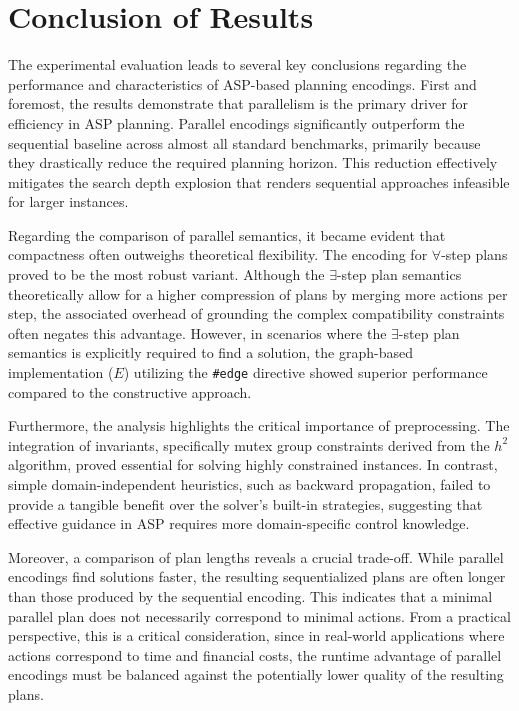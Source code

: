 \documentclass[
     11pt,                    %
     a4paper,             %
     BCOR=10mm,     %
     DIV=14,                 %
     listof=totoc,                    %
     bibliography=totoc,       %
     index=totoc,              %
     parskip            %
     twoside,
     headsepline
     ]{scrreprt}
\theoremstyle{definition}
\theoremstyle{definition}
\theoremstyle{remark}
\theoremstyle{bfnote}
\begin{document}
\section{Conclusion of Results}
The experimental evaluation leads to several key conclusions regarding the performance and characteristics of ASP-based planning encodings.
First and foremost, the results demonstrate that parallelism is the primary driver for efficiency in ASP planning. Parallel encodings significantly outperform the sequential baseline across almost all standard benchmarks, primarily because they drastically reduce the required planning horizon. This reduction effectively mitigates the search depth explosion that renders sequential approaches infeasible for larger instances.

Regarding the comparison of parallel semantics, it became evident that compactness often outweighs theoretical flexibility. The encoding for $\forall$-step plans proved to be the most robust variant. Although the $\exists$-step plan semantics theoretically allow for a higher compression of plans by merging more actions per step, the associated overhead of grounding the complex compatibility constraints often negates this advantage. However, in scenarios where the $\exists$-step plan semantics is explicitly required to find a solution, the graph-based implementation ($E$) utilizing the \texttt{\#edge} directive showed superior performance compared to the constructive approach.

Furthermore, the analysis highlights the critical importance of preprocessing. The integration of invariants, specifically mutex group constraints derived from the $h^2$ algorithm, proved essential for solving highly constrained instances. In contrast, simple domain-independent heuristics, such as backward propagation, failed to provide a tangible benefit over the solver's built-in strategies, suggesting that effective guidance in ASP requires more domain-specific control knowledge.

Moreover, a comparison of plan lengths reveals a crucial trade-off. While parallel encodings find solutions faster, the resulting sequentialized plans are often longer than those produced by the sequential encoding. This indicates that a minimal parallel plan does not necessarily correspond to minimal actions. From a practical perspective, this is a critical consideration, since in real-world applications where actions correspond to time and financial costs, the runtime advantage of parallel encodings must be balanced against the potentially lower quality of the resulting plans.
\end{document}
